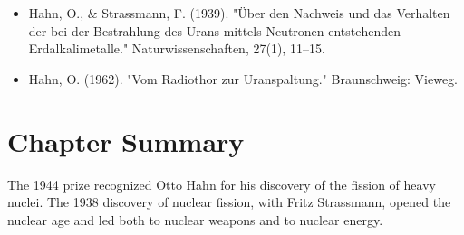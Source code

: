 \begin{itemize}

\item Hahn, O., \& Strassmann, F. (1939). "Über den Nachweis und das Verhalten der bei der Bestrahlung des Urans mittels Neutronen entstehenden Erdalkalimetalle." Naturwissenschaften, 27(1), 11--15.

\item Hahn, O. (1962). "Vom Radiothor zur Uranspaltung." Braunschweig: Vieweg.

\end{itemize}

\clearpage

\section*{Chapter Summary}

The 1944 prize recognized Otto Hahn for his discovery of the fission of heavy nuclei. The 1938 discovery of nuclear fission, with Fritz Strassmann, opened the nuclear age and led both to nuclear weapons and to nuclear energy.
